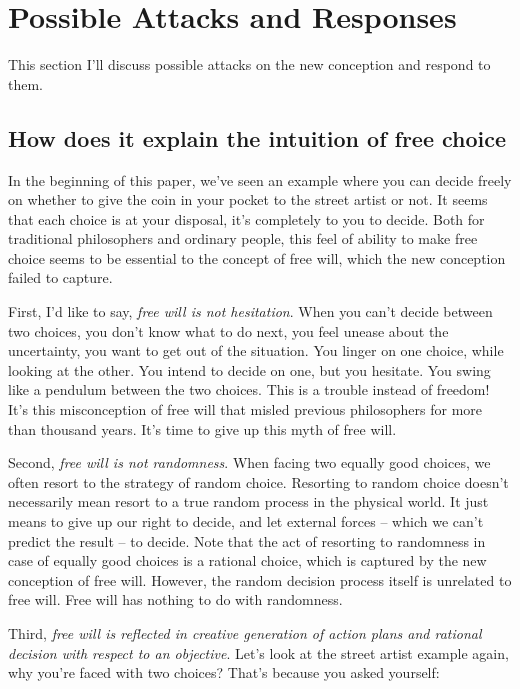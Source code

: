 \section{Possible Attacks and Responses}

This section I'll discuss possible attacks on the new conception and respond to them.

\subsection{How does it explain the intuition of free choice}

In the beginning of this paper, we've seen an example where you can decide freely on whether to give the coin in your pocket to the street artist or not. It seems that each choice is at your disposal, it's completely to you to decide. Both for traditional philosophers and ordinary people, this feel of ability to make free choice seems to be essential to the concept of free will, which the new conception failed to capture.

First, I'd like to say, \emph{free will is not hesitation}. When you can't decide between two choices, you don't know what to do next, you feel unease about the uncertainty, you want to get out of the situation. You linger on one choice, while looking at the other. You intend to decide on one, but you hesitate. You swing like a pendulum between the two choices. This is a trouble instead of freedom! It's this misconception of free will that misled previous philosophers for more than thousand years. It's time to give up this myth of free will.

Second, \emph{free will is not randomness}. When facing two equally good choices, we often resort to the strategy of random choice. Resorting to random choice doesn't necessarily mean resort to a true random process in the physical world. It just means to give up our right to decide, and let external forces -- which we can't predict the result -- to decide. Note that the act of resorting to randomness in case of equally good choices is a rational choice, which is captured by the new conception of free will. However, the random decision process itself is unrelated to free will. Free will has nothing to do with randomness.

Third, \emph{free will is reflected in creative generation of action plans and rational decision with respect to an objective}. Let's look at the street artist example again, why you're faced with two choices? That's because you asked yourself:

